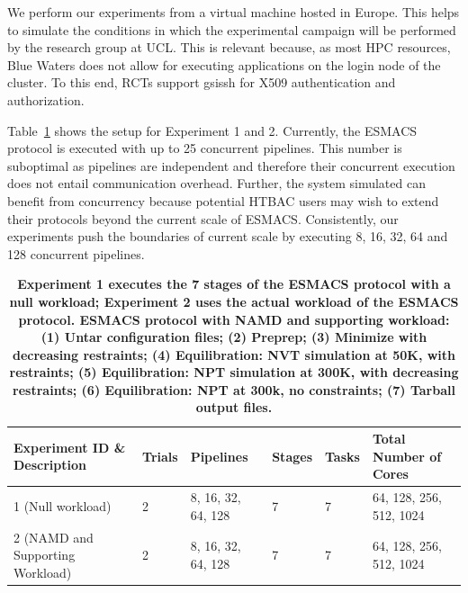 We perform our experiments from a virtual machine hosted in Europe. This
helps to simulate the conditions in which the experimental campaign will be
performed by the research group at UCL\@. This is relevant because, as most
HPC resources, Blue Waters does not allow for executing applications on the
login node of the cluster. To this end, RCTs support \textmd{gsissh} for X509
authentication and authorization.

Table~\ref{tab:exp} shows the setup for Experiment 1 and 2. Currently, the
ESMACS protocol is executed with up to 25 concurrent pipelines. This number
is suboptimal as pipelines are independent and therefore their concurrent
execution does not entail communication overhead. Further, the system
simulated can benefit from concurrency because potential HTBAC users may wish
to extend their protocols beyond the current scale of ESMACS\@. Consistently,
our experiments push the boundaries of current scale by executing 8, 16, 32,
64 and 128 concurrent pipelines.

\begin{table}[t]
\centering
\caption{\bf Experiment 1 executes the 7 stages of the ESMACS protocol with
a null workload; Experiment 2 uses the actual workload of the ESMACS
protocol. ESMACS protocol with NAMD and supporting workload: (1) Untar
configuration files; (2) Preprep; (3) Minimize with decreasing restraints;
(4) Equilibration: NVT simulation at 50K, with restraints; (5) Equilibration:
NPT simulation at 300K, with decreasing restraints; (6) Equilibration: NPT at
300k, no constraints; (7) Tarball output files.}\label{tab:exp}
\begin{tabular}{llllll}
\hline
\multicolumn{1}{l|}{Experiment ID \& Description} & \multicolumn{1}{l|}{Trials} & \multicolumn{1}{l|}{Pipelines} & \multicolumn{1}{l}{Stages} & \multicolumn{1}{l|}{Tasks} & \multicolumn{1}{l}{Total Number of Cores} \\ \hline
1 (Null workload)                                           & 2                           & 8, 16, 32, 64, 128             & 7                           & 7                          & 64, 128, 256, 512, 1024                    \\ \hline
2 (NAMD and Supporting Workload)                                       & 2                           & 8, 16, 32, 64, 128             & 7                           & 7                          & 64, 128, 256, 512, 1024                    \\ \hline
\end{tabular}
\end{table}


